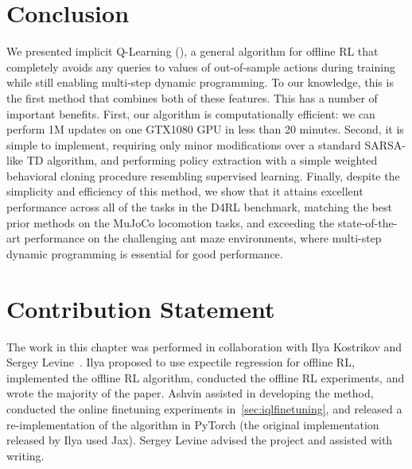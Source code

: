 \section{Conclusion}

We presented implicit Q-Learning (\ourname), a general algorithm for offline RL that completely avoids any queries to values of out-of-sample actions during training while still enabling multi-step dynamic programming. To our knowledge, this is the first method that combines both of these features. This has a number of important benefits. First, our algorithm is computationally efficient: we can perform 1M updates on one GTX1080 GPU in less than 20 minutes. Second, it is simple to implement, requiring only minor modifications over a standard SARSA-like TD algorithm, and performing policy extraction with a simple weighted behavioral cloning procedure resembling supervised learning. 
Finally, despite the simplicity and efficiency of this method, we show that it attains excellent performance across all of the tasks in the D4RL benchmark, matching the best prior methods on the MuJoCo locomotion tasks, and exceeding the state-of-the-art performance on the challenging ant maze environments, where multi-step dynamic programming is essential for good performance.

\section{Contribution Statement}

The work in this chapter was performed in collaboration with Ilya Kostrikov and Sergey Levine~\citep{kostrikov2021iql}. Ilya proposed to use expectile regression for offline RL, implemented the offline RL algorithm, conducted the offline RL experiments, and wrote the majority of the paper. Ashvin assisted in developing the method, conducted the online finetuning experiments in~\ref{sec:iqlfinetuning}, and released a re-implementation of the algorithm in PyTorch (the original implementation released by Ilya used Jax). Sergey Levine advised the project and assisted with writing.
